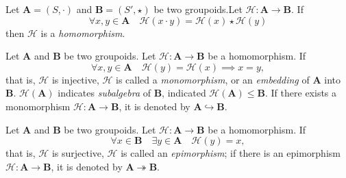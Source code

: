 \documentclass{../mcom-l}
\begin{document}
\begin{definition}\cite{burris1981course} 
Let $\mathbf{A} = (S, \cdot)$ and $\mathbf{B}=(S',\star)$ be two groupoids.\linebreak Let $\mathcal{H} : \mathbf{A} \to \mathbf{B}$.\newline
If 
\[\forall x,y \in \mathbf{A} \quad \mathcal{H}(x\cdot y)= \mathcal{H}(x)\star \mathcal{H}(y)\]
then $\mathcal{H}$ is a \emph{homomorphism}.
\end{definition}

\begin{definition}\label{monomorphismDefinition}\cite{burris1981course} 
Let \textbf{A} and \textbf{B} be two groupoids. Let $\mathcal{H} : \mathbf{A} \to \mathbf{B}$ be a homomorphism. If
\[\forall x, y \in \mathbf{A} \quad \mathcal{H}(y) = \mathcal{H}(x) \implies x = y,\]
that is, $\mathcal{H}$ is injective, $\mathcal{H}$ is called a \emph{monomorphism}, or an \emph{embedding} of \textbf{A} into \textbf{B}. $\mathcal{H}(\mathbf{A})$ indicates \emph{subalgebra} of \textbf{B}, indicated $\mathcal{H}(\mathbf{A}) \leq \mathbf{B}$.\newline\newline
If there exists a monomorphism $\mathcal{H}: \mathbf{A} \to \mathbf{B}$, it is denoted by $\mathbf{A} \hookrightarrow \mathbf{B}$.
\end{definition}
\begin{definition}\cite{burris1981course} 
Let \textbf{A} and \textbf{B} be two groupoids. Let $\mathcal{H} : \mathbf{A} \to \mathbf{B}$ be a homomorphism. If
\[\forall x \in \mathbf{B} \quad \exists y \in \mathbf{A} \quad  \mathcal{H}(y)=x,\]
that is, $\mathcal{H}$ is surjective, $\mathcal{H}$ is called an \emph{epimorphism}; if there is an epimorphism $\mathcal{H}: \mathbf{A}\to \mathbf{B}$, it is denoted by $\mathbf{A}\twoheadrightarrow \mathbf{B}$.
\end{definition}
\end{document}
